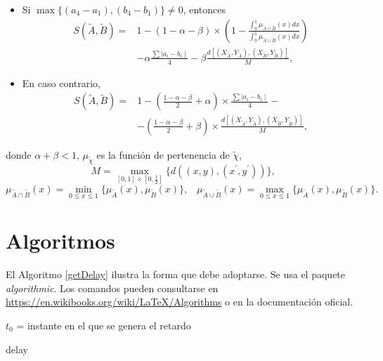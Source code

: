 \begin{itemize}
\item Si $\max \{(a_{4}-a_{1}),(b_{4}-b_{1})\}\neq 0$, entonces
\begin{align*}
S(\widetilde{A},\widetilde{B})=& 1 - ( 1 - \alpha - \beta) \times \left( 1 - \frac{\int_{0}^{1} \mu_{\widetilde{A}\cap \widetilde{B}}(x)dx} {\int_{0}^{1} \mu_{\widetilde{A}\cup \widetilde{B}}(x)dx}\right) \\
& -\alpha\frac{\sum \mid a_{i} - b_{i} \mid }{4}- \beta \frac{d[(X_{\widetilde{A} },Y_{\widetilde{A}}),(X_{\widetilde{B}} ,Y_{\widetilde{B}})]}{M},
\end{align*}

\item En caso contrario,%
\begin{align*}
S(\widetilde{A} ,\widetilde{B})=& 1- \left( \frac{1-\alpha-\beta}{2} + \alpha \right) \times
\frac{\sum \mid a_i - b_i \mid}{4} - \\
& - \left( \frac{1 - \alpha - \beta}{2} + \beta \right) \times \frac{d[(X_{\widetilde{A}},Y_{\widetilde{A}}), (X_{\widetilde{B}},Y_{\widetilde{B}})]}{M},
\end{align*}
\end{itemize}
donde $\alpha +\beta <1$, $\mu _{\widetilde{\chi }}$ es la función de pertenencia de $\widetilde{\chi}$, 
\begin{equation}
M=\underset{[0,1]\times[0,\frac{1}{2}]}{\max}\{d((x,y),(x^{\prime },y^{\prime }))\}\text{,} 
\end{equation}%
\begin{equation*}
\mu _{\widetilde{A}\cap \widetilde{B}}(x)=\underset{0\leq x\leq 1}{\min}%
\{\mu _{\widetilde{A}}(x),\mu _{\widetilde{B}}(x)\} ,
\;\;\; \mu _{\widetilde{A}\cup \widetilde{B}}(x)=\underset{0\leq x\leq 1}{\max}%
\{\mu _{\widetilde{A}}(x),\mu _{\widetilde{B}}(x)\}.
\end{equation*}%

\section{Algoritmos}

El Algoritmo \ref{getDelay} ilustra la forma que debe adoptarse. Se usa el paquete \textit{algorithmic}. Los comandos pueden consultarse en \url{https://en.wikibooks.org/wiki/LaTeX/Algorithms} o en la documentación oficial.

\begin{algorithm}[h]
	\begin{algorithmic}
	\REQUIRE $t_0$ = instante en el que se genera el retardo
	
		\ELSE
			\ELSE
			\ENDIF
		\ENDIF
	\ELSE
	\ENDIF
	
	\RETURN delay
	\end{algorithmic}
	\caption{$getDelay(t_0)$}
	\label{getDelay}
\end{algorithm}

